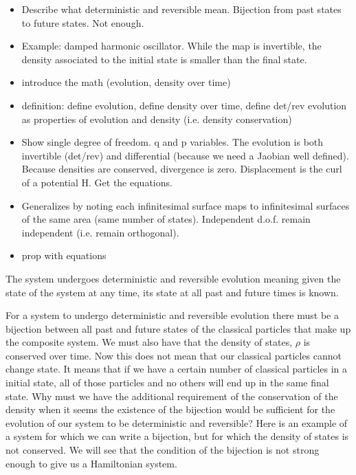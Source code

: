 \documentclass{article}
\begin{document}
\begin{itemize}
	\item Describe what deterministic and reversible mean. Bijection from past states to future states. Not enough.
	
	\item Example: damped harmonic oscillator. While the map is invertible, the density associated to the initial state is smaller than the final state.
	
	\item introduce the math (evolution, density over time)
	
	\item definition: define evolution, define density over time, define det/rev evolution as properties of evolution and density (i.e. density conservation)
	
	\item Show single degree of freedom. q and p variables. The evolution is both invertible (det/rev) and differential (because we need a Jaobian well defined). Because densities are conserved, divergence is zero. Displacement is the curl of a potential H. Get the equations.
	
	\item Generalizes by noting each infinitesimal surface maps to infinitesimal surfaces of the same area (same number of states). Independent d.o.f. remain independent (i.e. remain orthogonal).
	
	\item prop with equations
	
\end{itemize}


\begin{assump}
	The system undergoes deterministic and reversible evolution meaning given the state of the system at any time, its state at all past and future times is known.
\end{assump}

	For a system to undergo deterministic and reversible evolution there must be a bijection between all past and future states of the classical particles that make up the composite system. We must also have that the density of states, $\rho$ is conserved over time. Now this does not mean that our classical particles cannot change state. It means that if we have a certain number of classical particles in a initial state, all of those particles and no others will end up in the same final state. Why must we have the additional requirement of the conservation of the density when it seems the existence of the bijection would be sufficient for the evolution of our system to be deterministic and reversible? Here is an example of a system for which we can write a bijection, but for which the density of states is not conserved. We will see that the condition of the bijection is not strong enough to give us a Hamiltonian system.
	
\end{document}
